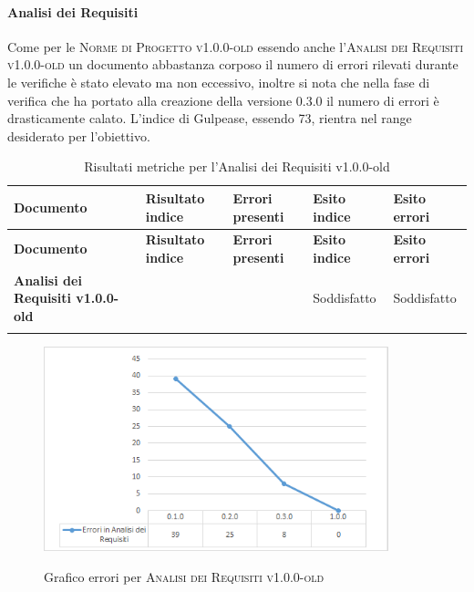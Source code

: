 \documentclass[../piano-di-qualifica.tex]{subfiles}
\begin{document}
\paragraph{Analisi dei Requisiti}
\label{sub:analisi_dei_requisiti}
Come per le \textsc{Norme di Progetto v1.0.0-old} essendo anche l'\textsc{Analisi dei Requisiti v1.0.0-old} un documento abbastanza corposo il numero di errori rilevati durante le verifiche è stato elevato ma non eccessivo, inoltre si nota che nella fase di verifica che ha portato alla creazione della versione 0.3.0 il numero di errori è drasticamente calato. 
L'indice di Gulpease, essendo 73, rientra nel range desiderato per l'obiettivo.

\renewcommand{\arraystretch}{2} %
\begin{longtable}[H]{>{\centering\bfseries}m{6cm} >{\centering}m{2cm} >{\centering}m{2.5cm} >{\centering}m{2.5cm} >{\centering\arraybackslash}m{2.5cm}}  
  \rowcolor{lightgray}
  {\textbf{Documento}} & {\textbf{Risultato indice}} & {\textbf{Errori presenti}} & {\textbf{Esito indice}} & {\textbf{Esito errori}}  \\
  \endfirsthead%
  \rowcolor{lightgray}
  {\textbf{Documento}} & {\textbf{Risultato indice}} & {\textbf{Errori presenti}} & {\textbf{Esito indice}} & {\textbf{Esito errori}}  \\
  \endhead%
  \textbf{Analisi dei Requisiti v1.0.0-old} & 73                 & 0               & Soddisfatto & Soddisfatto \\
  \caption{Risultati metriche per l'Analisi dei Requisiti v1.0.0-old}
  \label{tab:my-table}
\end{longtable}

    \begin{figure}[H]
        \centering
        \includegraphics[width=10cm]{img/erroriAnalisi.png}
        \label{fig:scice_documenti}
        \caption{Grafico errori per \textsc{Analisi dei Requisiti v1.0.0-old}}
    \end{figure}
\end{document}
